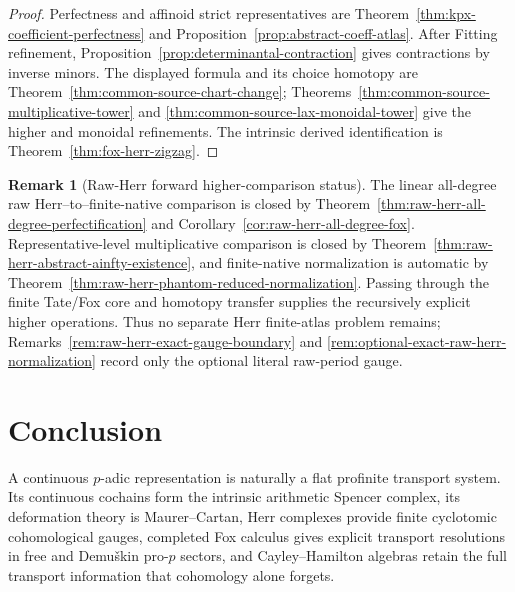 \documentclass[11pt]{article}
\theoremstyle{definition}
\newtheorem{remark}[theorem]{Remark}
\begin{document}
\begin{proof}
Perfectness and affinoid strict representatives are Theorem~\ref{thm:kpx-coefficient-perfectness} and Proposition~\ref{prop:abstract-coeff-atlas}.  After Fitting refinement, Proposition~\ref{prop:determinantal-contraction} gives contractions by inverse minors.  The displayed formula and its choice homotopy are Theorem~\ref{thm:common-source-chart-change}; Theorems~\ref{thm:common-source-multiplicative-tower} and \ref{thm:common-source-lax-monoidal-tower} give the higher and monoidal refinements.  The intrinsic derived identification is Theorem~\ref{thm:fox-herr-zigzag}.
\end{proof}

\begin{remark}[Raw-Herr forward higher-comparison status]\label{rem:herr-finite-atlas-status}
The linear all-degree raw Herr--to--finite-native comparison is closed by Theorem~\ref{thm:raw-herr-all-degree-perfectification} and Corollary~\ref{cor:raw-herr-all-degree-fox}.  Representative-level multiplicative comparison is closed by Theorem~\ref{thm:raw-herr-abstract-ainfty-existence}, and finite-native normalization is automatic by Theorem~\ref{thm:raw-herr-phantom-reduced-normalization}.  Passing through the finite Tate/Fox core and homotopy transfer supplies the recursively explicit higher operations.  Thus no separate Herr finite-atlas problem remains; Remarks~\ref{rem:raw-herr-exact-gauge-boundary} and \ref{rem:optional-exact-raw-herr-normalization} record only the optional literal raw-period gauge.
\end{remark}

\section{Conclusion}

A continuous $p$-adic representation is naturally a flat profinite transport system.  Its continuous cochains form the intrinsic arithmetic Spencer complex, its deformation theory is Maurer--Cartan, Herr complexes provide finite cyclotomic cohomological gauges, completed Fox calculus gives explicit transport resolutions in free and Demu\v{s}kin pro-$p$ sectors, and Cayley--Hamilton algebras retain the full transport information that cohomology alone forgets.
\end{document}
